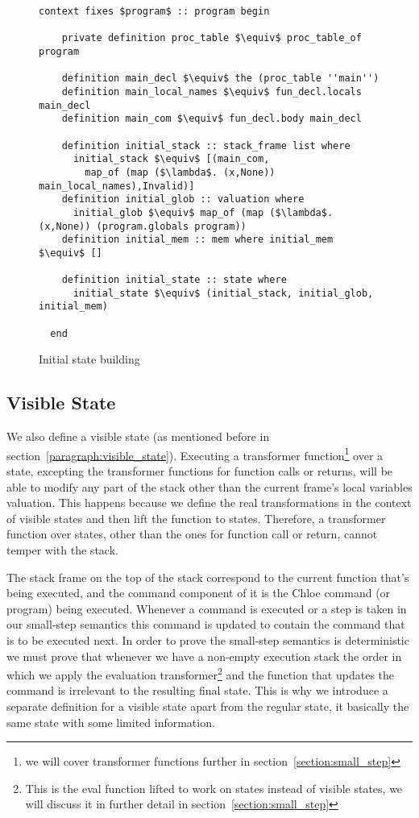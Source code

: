 \begin{figure}
  \begin{lstlisting}[frame=single, mathescape=true]
  context fixes $program$ :: program begin

    private definition proc_table $\equiv$ proc_table_of program

    definition main_decl $\equiv$ the (proc_table ''main'')
    definition main_local_names $\equiv$ fun_decl.locals main_decl
    definition main_com $\equiv$ fun_decl.body main_decl

    definition initial_stack :: stack_frame list where
      initial_stack $\equiv$ [(main_com,
        map_of (map ($\lambda$. (x,None)) main_local_names),Invalid)]
    definition initial_glob :: valuation where
      initial_glob $\equiv$ map_of (map ($\lambda$. (x,None)) (program.globals program))
    definition initial_mem :: mem where initial_mem $\equiv$ []

    definition initial_state :: state where
      initial_state $\equiv$ (initial_stack, initial_glob, initial_mem)

  end
  \end{lstlisting}

  \caption{Initial state building}
  \label{fig:init_state_building}
\end{figure}



\subsection{Visible State}\label{subsection:visible_state}
We also define a visible state (as mentioned before in section~\ref{paragraph:visible_state}).
Executing a transformer function\footnote{we will cover transformer functions further in section~\ref{section:small_step}} over a state, excepting the transformer functions for function calls or returns, will be able to modify any part of the stack other than the current frame's local variables valuation.
This happens because we define the real transformations in the context of visible states and then lift the function to states.
Therefore, a transformer function over states, other than the ones for function call or return, cannot temper with the stack.

The stack frame on the top of the stack correspond to the current function that's being executed, and the command component of it is the Chloe command (or program) being executed.
Whenever a command is executed or a step is taken in our small-step semantics this command is updated to contain the command that is to be executed next.
In order to prove the small-step semantics is deterministic we must prove that whenever we have a non-empty execution stack the order in which we apply the evaluation transformer\footnote{This is the eval function lifted to work on states instead of visible states, we will discuss it in further detail in section~\ref{section:small_step}} and the function that updates the command is irrelevant to the resulting final state.
This is why we introduce a separate definition for a visible state apart from the regular state, it basically the same state with some limited information.

